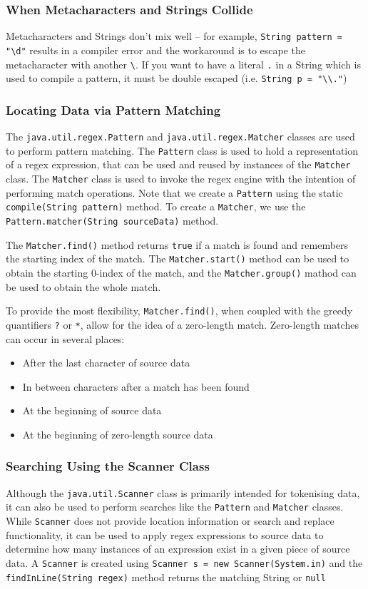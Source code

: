 \subsubsection{When Metacharacters and Strings Collide}
Metacharacters and Strings don't mix well -- for example,
\verb#String pattern = "\d"# results in a compiler error and the workaround is 
to escape the metacharacter with another \verb#\#. If you want to have a 
literal \verb#.# in a String which is used to compile a pattern, it must be 
double escaped (i.e. \verb#String p = "\\."#)

\subsubsection{Locating Data via Pattern Matching}
The \verb#java.util.regex.Pattern# and \verb#java.util.regex.Matcher# classes 
are used to perform pattern matching. The \verb#Pattern# class is used to hold 
a representation of a regex expression, that can be used and reused by 
instances of the \verb#Matcher# class. The \verb#Matcher# class is used to 
invoke the regex engine with the intention of performing match operations. Note 
that we create a \verb#Pattern# using the static \verb#compile(String pattern)# 
method. To create a \verb#Matcher#, we use the
\verb#Pattern.matcher(String sourceData)# method.

The \verb#Matcher.find()# method returns \verb#true# if a match is found and 
remembers the starting index of the match. The \verb#Matcher.start()# method 
can be used to obtain the starting 0-index of the match, and the 
\verb#Matcher.group()# mathod can be used to obtain the whole match.

To provide the most flexibility, \verb#Matcher.find()#, when coupled with the 
greedy quantifiers \verb#?# or \verb#*#, allow for the idea of a zero-length 
match. Zero-length matches can occur in several places:
\begin{itemize}
    \item After the last character of source data
    \item In between characters after a match has been found
    \item At the beginning of source data
    \item At the beginning of zero-length source data
\end{itemize}

\subsubsection{Searching Using the Scanner Class}
Although the \verb#java.util.Scanner# class is primarily intended for 
tokenising data, it can also be used to perform searches like the 
\verb#Pattern# and \verb#Matcher# classes. While \verb#Scanner# does not 
provide location information or search and replace functionality, it can be 
used to apply regex expressions to source data to determine how many instances 
of an expression exist in a given piece of source data. A \verb#Scanner# is 
created using \verb#Scanner s = new Scanner(System.in)# and the 
\verb#findInLine(String regex)# method returns the matching String or 
\verb#null#

